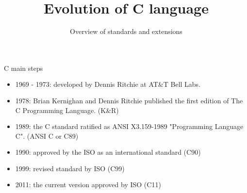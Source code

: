

\title{Evolution of C language}
\subtitle{Overview of standards and extensions}

%


\frame{\titlepage}
\begin{frame}{C main steps}
    \begin{itemize}
        \item 1969 - 1973: developed by Dennis Ritchie at AT\&T Bell Labs.
        \pause\item 1978: Brian Kernighan and Dennis Ritchie published the first edition of The C Programming Language. (K\&R)
        \pause\item 1989: the C standard ratified as ANSI X3.159-1989 "Programming Language C". (ANSI C or C89)
        \pause\item 1990: approved by the ISO as an international standard (C90)
        \pause\item 1999: revised standard by ISO (C99)
        \pause\item 2011: the current version approved by ISO (C11)
    \end{itemize}
\end{frame}
